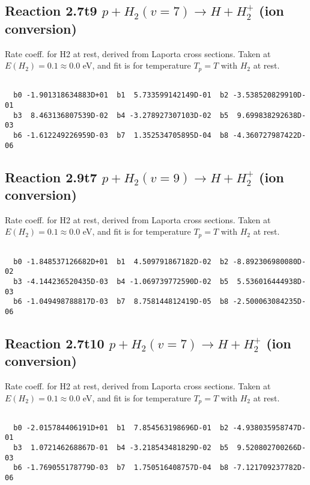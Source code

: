 \documentclass[12pt,dvipdfmx]{article}
\begin{document}
\newpage
\subsection{
Reaction 2.7t9
$ p + H_2(v=7) \rightarrow H + H_2^+$ (ion conversion)
}
Rate coeff. for H2 at rest, derived from Laporta cross sections.
Taken at $E(H_2) = 0.1 \approx 0.0$ eV,  and fit is for temperature $T_p=T$ with $H_2$ at rest.

\begin{small}\begin{verbatim}

  b0 -1.901318634883D+01  b1  5.733599142149D-01  b2 -3.538520829910D-01
  b3  8.463136807539D-02  b4 -3.278927307103D-02  b5  9.699838292638D-03
  b6 -1.612249226959D-03  b7  1.352534705895D-04  b8 -4.360727987422D-06

\end{verbatim}\end{small}

\newpage
\subsection{
Reaction 2.9t7
$ p + H_2(v=9) \rightarrow H + H_2^+$ (ion conversion)
}
Rate coeff. for H2 at rest, derived from Laporta cross sections.
Taken at $E(H_2) = 0.1 \approx 0.0$ eV,  and fit is for temperature $T_p=T$ with $H_2$ at rest.

\begin{small}\begin{verbatim}

  b0 -1.848537126682D+01  b1  4.509791867182D-02  b2 -8.892306980080D-02
  b3 -4.144236520435D-03  b4 -1.069739772590D-02  b5  5.536016444938D-03
  b6 -1.049498788817D-03  b7  8.758144812419D-05  b8 -2.500063084235D-06

\end{verbatim}\end{small}

\newpage
\subsection{
Reaction 2.7t10
$ p + H_2(v=7) \rightarrow H + H_2^+$ (ion conversion)
}
Rate coeff. for H2 at rest, derived from Laporta cross sections.
Taken at $E(H_2) = 0.1 \approx 0.0$ eV,  and fit is for temperature $T_p=T$ with $H_2$ at rest.

\begin{small}\begin{verbatim}

  b0 -2.015784406191D+01  b1  7.854563198696D-01  b2 -4.938035958747D-01
  b3  1.072146268867D-01  b4 -3.218543481829D-02  b5  9.520802700266D-03
  b6 -1.769055178779D-03  b7  1.750516408757D-04  b8 -7.121709237782D-06

\end{verbatim}\end{small}
\end{document}

